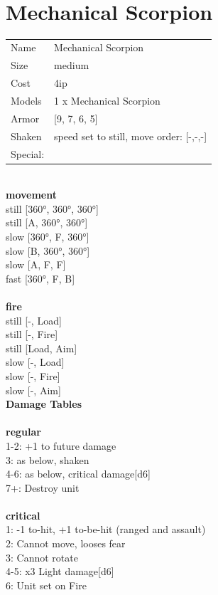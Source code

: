 { 
\ \\













\clearpage

\section{ Mechanical Scorpion }

\begin{tabular}{ll}
  Name & Mechanical Scorpion \\
  Size & medium\\
  Cost & 4ip\\
  Models & 1 x Mechanical Scorpion\\
  Armor & [9, 7, 6, 5]\\
  Shaken & speed set to still, move order: [-,-,-]\\
  Special: \\
\end{tabular}

\noindent 

\ \\ {\bf movement } \\
still [360°, 360°, 360°] \\
still [A, 360°, 360°] \\
slow [360°, F, 360°] \\
slow [B, 360°, 360°] \\
slow [A, F, F] \\
fast [360°, F, B] \\
\ \\ {\bf fire } \\
still [-, Load] \\
still [-, Fire] \\
still [Load, Aim] \\
slow [-, Load] \\
slow [-, Fire] \\
slow [-, Aim] \\


{\bf Damage Tables} \\
\ \\ {\bf regular } \\
1-2: +1 to future damage \\
3: as below, shaken \\
4-6: as below, critical damage[d6] \\
7+: Destroy unit \\
\ \\ {\bf critical } \\
1: -1 to-hit, +1 to-be-hit (ranged and assault) \\
2: Cannot move, looses fear \\
3: Cannot rotate \\
4-5: x3 Light damage[d6] \\
6: Unit set on Fire \\


}
